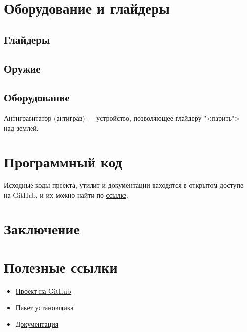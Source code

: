 \documentclass[a4paper,12pt]{report}
\begin{document}
\chapter{Оборудование и глайдеры}
\section{Глайдеры}
\section{Оружие}
\section{Оборудование}

Антигравитатор (антиграв) --- устройство, позволяющее глайдеру "<парить"> над землёй.

\chapter{Программный код}

Исходные коды проекта, утилит и документации находятся в открытом доступе на GitHub, и их можно найти по \href{https://github.com/aimrebirth}{ссылке}.

\chapter*{Заключение}

\chapter*{Полезные ссылки}

\begin{itemize}
\item \href{https://github.com/aimrebirth}{Проект на GitHub}
\item \href{https://www.dropbox.com/s/0zhbgb1ftspcv9w/polygon4.zip?dl=1}{Пакет установщика}
\item \href{https://www.dropbox.com/s/ipnakg5civ0xp0g/Polygon4_ru.pdf?dl=1}{Документация}
\end{itemize}
\end{document}
